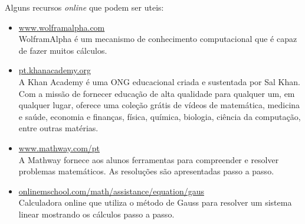 Alguns recursos \textit{online} que podem ser uteis:
\begin{itemize}
    \item \href{http://www.wolframalpha.com}{www.wolframalpha.com} \\
         WolframAlpha é um mecanismo de conhecimento computacional que é capaz de fazer muitos cálculos.

    \item \href{http://pt.khanacademy.org}{pt.khanacademy.org} \\
        A Khan Academy é uma ONG educacional criada e sustentada por Sal Khan.
        Com a missão de fornecer educação de alta qualidade para qualquer um, em qualquer lugar,
        oferece uma coleção grátis de vídeos de matemática, medicina e saúde, economia e finanças,
        física, química, biologia, ciência da computação, entre outras matérias.

    \item \href{http://www.mathway.com/pt}{www.mathway.com/pt} \\
        A Mathway fornece aos alunos ferramentas para compreender e resolver problemas matemáticos.
        As resoluções são apresentadas passo a passo.

    \item \href{http://onlinemschool.com/math/assistance/equation/gaus}{onlinemschool.com/math/assistance/equation/gaus} \\
        Calculadora online que utiliza o método de Gauss para resolver um sistema linear mostrando os cálculos passo a passo.
\end{itemize}



